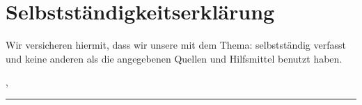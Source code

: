 
\thispagestyle{plain}
\section*{Selbstständigkeitserklärung}

\vspace*{2em}


Wir versicheren hiermit, dass wir unsere {\arbeit} mit dem Thema: {\itshape{} \titel{}\/} selbstständig verfasst und keine anderen als die angegebenen Quellen und Hilfsmittel benutzt haben.

\vspace{3em}

\abgabeort, \datumAbgabe
\vspace{4em}

\rule{6cm}{0.4pt}\\
\autor
